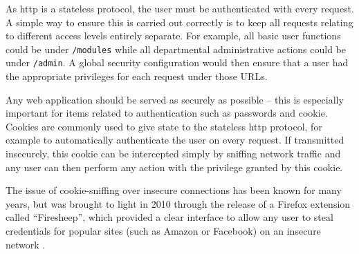 
As \gls{http} is a stateless protocol, the user must be authenticated with
every request. A simple way to ensure this is carried out correctly is to keep
all requests relating to different access levels entirely separate. For
example, all basic user functions could be under \texttt{/modules} while all
departmental administrative actions could be under \texttt{/admin}. A global
security configuration would then ensure that a user had the appropriate
privileges for each request under those URLs.


Any web application should be served as securely as possible -- this is
especially important for items related to authentication such as passwords and
\gls{cookie}. Cookies are commonly used to give state to the stateless
\gls{http} protocol, for example to automatically authenticate the user on
every request. If transmitted insecurely, this cookie can be intercepted
simply by sniffing network traffic and any user can then perform any action
with the privilege granted by this cookie.

The issue of cookie-sniffing over insecure connections has been known for many
years, but was brought to light in 2010 through the release of a Firefox
extension called ``Firesheep'', which provided a clear interface to allow any
user to steal credentials for popular sites (such as Amazon or Facebook) on an
insecure network \cite{FiresheepHow_2011}.
